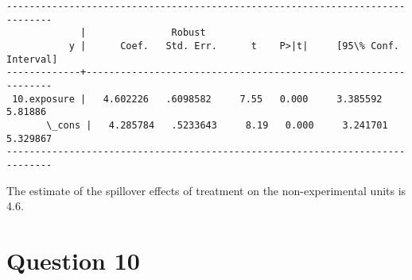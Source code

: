 \documentclass[11pt,notitlepage]{article}\usepackage[]{graphicx}\usepackage[]{color}
\makeatletter
\newenvironment{kframe}{%
 \def\at@end@of@kframe{}%
 \ifinner\ifhmode%
  \def\at@end@of@kframe{\end{minipage}}%
  \begin{minipage}{\columnwidth}%
 \fi\fi%
 \def\FrameCommand##1{\hskip\@totalleftmargin \hskip-\fboxsep
 \colorbox{shadecolor}{##1}\hskip-\fboxsep
     \hskip-\linewidth \hskip-\@totalleftmargin \hskip\columnwidth}%
 \MakeFramed {\advance\hsize-\width
   \@totalleftmargin\z@ \linewidth\hsize
   \@setminipage}}%
 {\par\unskip\endMakeFramed%
 \at@end@of@kframe}
\newenvironment{knitrout}{}{} %
\makeatother
\begin{document}
\begin{enumerate}[a)]
\begin{knitrout}
\begin{kframe}
\begin{Verbatim}[commandchars=\\\{\}]
------------------------------------------------------------------------------
             |               Robust
           y |      Coef.   Std. Err.      t    P>|t|     [95\% Conf. Interval]
-------------+----------------------------------------------------------------
 10.exposure |   4.602226   .6098582     7.55   0.000     3.385592     5.81886
       \_cons |   4.285784   .5233643     8.19   0.000     3.241701    5.329867
------------------------------------------------------------------------------

    \end{Verbatim}
\end{kframe}
\end{knitrout}
 
\end{enumerate}

The estimate of the spillover effects of treatment on the non-experimental units is 4.6.


\section*{Question 10}
\begin{knitrout}
\color{fgcolor}\begin{kframe}
\begin{verbatim}






\end{verbatim}
\end{kframe}
\end{knitrout}
\end{document}
